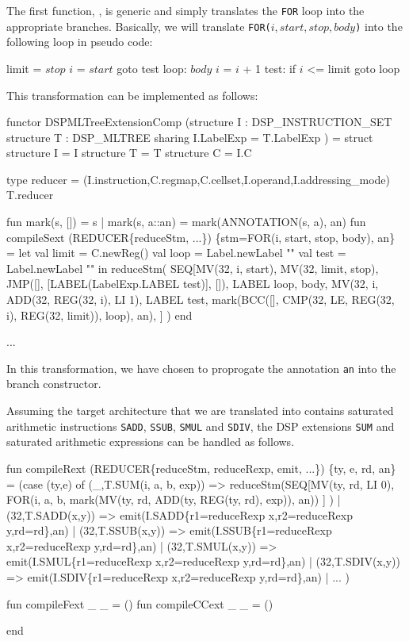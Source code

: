 The first function, , is generic and simply
translates the \verb|FOR| loop into the appropriate branches.
Basically, we will translate \verb|FOR(|$i,start,stop,body$\verb|)| into
the following loop in pseudo code:
\begin{SML}
        limit = \(stop\)
        \(i\)  = \(start\)
        goto test
  loop: \(body\)
        \(i\) = \(i\) + 1
  test: if \(i\) <= limit goto loop
\end{SML}
This transformation can be implemented as follows:
\begin{SML}
 functor DSPMLTreeExtensionComp
    (structure I : DSP_INSTRUCTION_SET
     structure T : DSP_MLTREE
       sharing I.LabelExp = T.LabelExp
    ) =
 struct
   structure I = I
   structure T = T
   structure C = I.C

   type reducer = 
     (I.instruction,C.regmap,C.cellset,I.operand,I.addressing_mode) T.reducer
   
   fun mark(s, []) = s
     | mark(s, a::an) = mark(ANNOTATION(s, a), an)
   fun compileSext (REDUCER\{reduceStm, ...\}) 
      \{stm=FOR(i, start, stop, body), an\} =
   let val limit = C.newReg()
       val loop  = Label.newLabel ""
       val test  = Label.newLabel ""
   in  reduceStm(
         SEQ[MV(32, i, start),
             MV(32, limit, stop),
             JMP([], [LABEL(LabelExp.LABEL test)], []),
             LABEL loop,
             body,
             MV(32, i, ADD(32, REG(32, i), LI 1),
             LABEL test,
             mark(BCC([], 
                    CMP(32, LE, REG(32, i), REG(32, limit)), 
                      loop),
                  an),
            ]
      )
   end

   ...
\end{SML}
In this transformation, we have chosen to proprogate the annotation
\verb|an| into the branch constructor.

Assuming the target architecture that we are translated into contains
saturated arithmetic instructions \verb|SADD|, \verb|SSUB|, \verb|SMUL|
and \verb|SDIV|, the DSP extensions
\verb|SUM| and saturated arithmetic expressions can be handled as follows.
\begin{SML}
   fun compileRext (REDUCER\{reduceStm, reduceRexp, emit, ...\}) 
       \{ty, e, rd, an\} =
   (case (ty,e) of
      (_,T.SUM(i, a, b, exp)) =>
        reduceStm(SEQ[MV(ty, rd, LI 0),
                      FOR(i, a, b, 
                         mark(MV(ty, rd, ADD(ty, REG(ty, rd), exp)), an))
                     ]
                 )
   | (32,T.SADD(x,y)) => emit(I.SADD\{r1=reduceRexp x,r2=reduceRexp y,rd=rd\},an)
   | (32,T.SSUB(x,y)) => emit(I.SSUB\{r1=reduceRexp x,r2=reduceRexp y,rd=rd\},an)
   | (32,T.SMUL(x,y)) => emit(I.SMUL\{r1=reduceRexp x,r2=reduceRexp y,rd=rd\},an)
   | (32,T.SDIV(x,y)) => emit(I.SDIV\{r1=reduceRexp x,r2=reduceRexp y,rd=rd\},an)
   | ...
   )

   fun compileFext _ _ = ()
   fun compileCCext _ _ = ()

  end
\end{SML}

